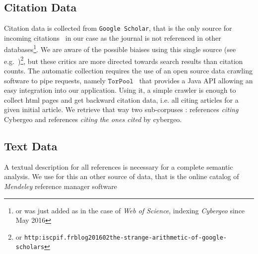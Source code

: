 \subsection*{Citation Data}

Citation data is collected from \texttt{Google Scholar}, that is the only source for incoming citations~\cite{noruzi2005google} in our case as the journal is not referenced in other databases\footnote{or was just added as in the case of \textit{Web of Science}, indexing \textit{Cybergeo} since May 2016}. We are aware of the possible biaises using this single source (see e.g.~\cite{bohannon2014scientific})\footnote{or \texttt{http:\/\/iscpif.fr\/blog\/2016\/02\/the-strange-arithmetic-of-google-scholars}}, but these critics are more directed towards search results than citation counts. The automatic collection requires the use of an open source data crawling software to pipe requests, namely $\texttt{TorPool}$~\cite{} %
 that provides a Java API allowing an easy integration into our application. Using it, a simple crawler is enough to collect html pages and get backward citation data, i.e. all citing articles for a given initial article. We retrieve that way two sub-corpuses : references \emph{citing} Cybergeo and references \emph{citing the ones cited} by cybergeo.


\subsection*{Text Data}


A textual description for all references is necessary for a complete semantic analysis. We use for this an other source of data, that is the online catalog of \textit{Mendeley} reference manager software~\cite{}


